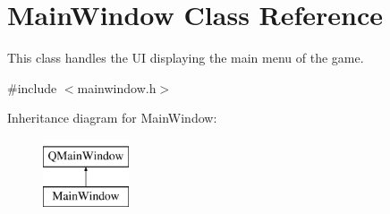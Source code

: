 \hypertarget{class_main_window}{}\section{Main\+Window Class Reference}
\label{class_main_window}


This class handles the UI displaying the main menu of the game.  




{\ttfamily \#include $<$mainwindow.\+h$>$}

Inheritance diagram for Main\+Window\+:\begin{figure}[H]
\begin{center}
\leavevmode
\includegraphics[height=2.000000cm]{class_main_window}
\end{center}
\end{figure}
